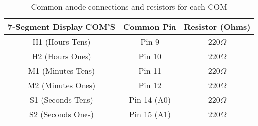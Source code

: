 \begin{table}[h]
    \centering
    \begin{tabular}{|c|c|c|}
        \hline
        \textbf{7-Segment Display COM'S} & \textbf{Common Pin} & \textbf{Resistor (Ohms)} \\
        \hline
        H1 (Hours Tens) & Pin 9  & 220$\Omega$ \\
        H2 (Hours Ones) & Pin 10 & 220$\Omega$ \\
        M1 (Minutes Tens) & Pin 11 & 220$\Omega$ \\
        M2 (Minutes Ones) & Pin 12 & 220$\Omega$ \\
        S1 (Seconds Tens) & Pin 14 (A0) & 220$\Omega$ \\
        S2 (Seconds Ones) & Pin 15 (A1) & 220$\Omega$ \\
        \hline
    \end{tabular}
    \caption{Common anode connections and resistors for each COM}
\end{table}

